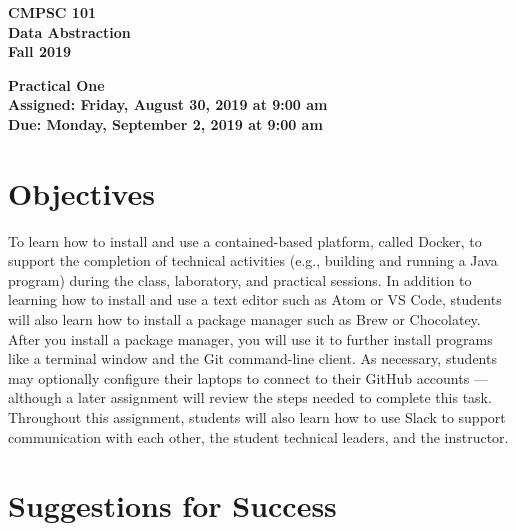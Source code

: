 \documentclass[11pt]{article}
\newcommand{\assignmentduedate}{September 2}
\newcommand{\assignmentassignedate}{August 30}
\newcommand{\assignmentnumber}{One}
\newcommand{\labyear}{2019}
\newcommand{\labdueday}{Monday}
\newcommand{\labassignday}{Friday}
\newcommand{\labtime}{9:00 am}
\newcommand{\assigneddate}{Assigned: \labassignday, \assignmentassignedate, \labyear{} at \labtime{}}
\newcommand{\duedate}{Due: \labdueday, \assignmentduedate, \labyear{} at \labtime{}}
\newcommand{\labtitle}[1]
{
  \begin{center}
    \begin{center}
      \bf
      CMPSC 101\\Data Abstraction\\
      Fall 2019\\
      \medskip
    \end{center}
    \bf
    #1
  \end{center}
}
\begin{document}
\thispagestyle{empty}

\labtitle{Practical \assignmentnumber{} \\ \assigneddate{} \\ \duedate{}}



\section*{Objectives}

To learn how to install and use a contained-based platform, called Docker, to
support the completion of technical activities (e.g., building and running a
Java program) during the class, laboratory, and practical sessions. In addition
to learning how to install and use a text editor such as Atom or VS Code,
students will also learn how to install a package manager such as Brew or
Chocolatey. After you install a package manager, you will use it to further
install programs like a terminal window and the Git command-line client. As
necessary, students may optionally configure their laptops to connect to their
GitHub accounts --- although a later assignment will review the steps needed to
complete this task. Throughout this assignment, students will also learn how to
use Slack to support communication with each other, the student technical
leaders, and the instructor.

\section*{Suggestions for Success}
\end{document}

